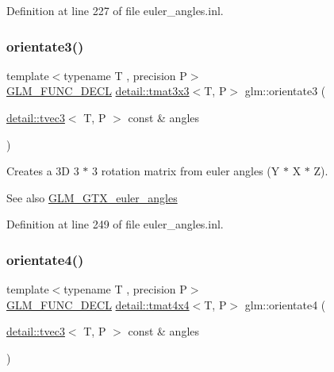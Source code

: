 Definition at line 227 of file euler\+\_\+angles.\+inl.

\mbox{\label{group__gtx__euler__angles_gab6a2a986916647ddedc94bbd2516f20c}} 
\subsubsection{\texorpdfstring{orientate3()}{orientate3()}\hspace{0.1cm}{\footnotesize\ttfamily [2/2]}}
{\footnotesize\ttfamily template$<$typename T , precision P$>$ \\
\hyperlink{setup_8hpp_ab2d052de21a70539923e9bcbf6e83a51}{G\+L\+M\+\_\+\+F\+U\+N\+C\+\_\+\+D\+E\+CL} \hyperlink{structglm_1_1detail_1_1tmat3x3}{detail\+::tmat3x3}$<$T, P$>$ glm\+::orientate3 (\begin{DoxyParamCaption}\item[{\hyperlink{structglm_1_1detail_1_1tvec3}{detail\+::tvec3}$<$ T, P $>$ const \&}]{angles }\end{DoxyParamCaption})}

Creates a 3D 3 $\ast$ 3 rotation matrix from euler angles (Y $\ast$ X $\ast$ Z). \begin{DoxySeeAlso}{See also}
\hyperlink{group__gtx__euler__angles}{G\+L\+M\+\_\+\+G\+T\+X\+\_\+euler\+\_\+angles} 
\end{DoxySeeAlso}


Definition at line 249 of file euler\+\_\+angles.\+inl.

\mbox{\label{group__gtx__euler__angles_ga3b9f62da9726cdad708df41712792082}} 
\subsubsection{\texorpdfstring{orientate4()}{orientate4()}}
{\footnotesize\ttfamily template$<$typename T , precision P$>$ \\
\hyperlink{setup_8hpp_ab2d052de21a70539923e9bcbf6e83a51}{G\+L\+M\+\_\+\+F\+U\+N\+C\+\_\+\+D\+E\+CL} \hyperlink{structglm_1_1detail_1_1tmat4x4}{detail\+::tmat4x4}$<$T, P$>$ glm\+::orientate4 (\begin{DoxyParamCaption}\item[{\hyperlink{structglm_1_1detail_1_1tvec3}{detail\+::tvec3}$<$ T, P $>$ const \&}]{angles }\end{DoxyParamCaption})}

